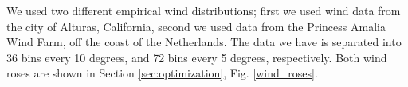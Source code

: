 \documentclass[wes, manuscript]{copernicus}
\begin{document}
We used two different empirical wind distributions; first we used wind data from the city of Alturas, California, second we used data from the Princess Amalia Wind Farm, off the coast of the Netherlands. 
The data we have is separated into 36 bins every 10 degrees, and 72 bins every 5 degrees, respectively. Both wind roses are shown in Section \ref{sec:optimization}, Fig. \ref{wind_roses}.


\end{document}
